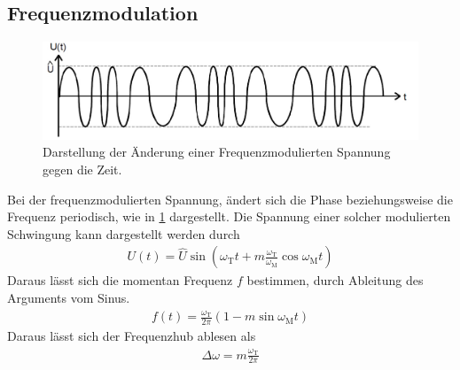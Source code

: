 \newpage
\subsection{Frequenzmodulation}
\begin{figure}[h!]
	\centering
	\includegraphics[width = \textwidth]{../Grafiken/Frequenzmodulation.pdf}
	\caption{Darstellung der Änderung einer Frequenzmodulierten Spannung gegen die Zeit.\cite{V59}\label{fig:Frequenzmodulation}}
\end{figure}
Bei der frequenzmodulierten Spannung, ändert sich die Phase beziehungsweise die Frequenz periodisch, wie in \cref{fig:Frequenzmodulation} dargestellt.
Die Spannung einer solcher modulierten Schwingung kann dargestellt werden durch
\begin{align}
	U(t)=\hat U \sin\left(\omega_\text{T}t+m\frac{\omega_\text{T}}{\omega_\text{M}}\cos\omega_\text{M}t\right)
\end{align}
Daraus lässt sich die momentan Frequenz $f$ bestimmen, durch Ableitung des Arguments vom Sinus.
\begin{align}
	f(t)=\frac{\omega_\text{T}}{2\pi}\left(1-m\sin\omega_\text{M}t\right)
\end{align}
Daraus lässt sich der Frequenzhub ablesen als
\begin{align}
	\Delta \omega = m\frac{\omega_\text{T}}{2\pi}
\end{align}
